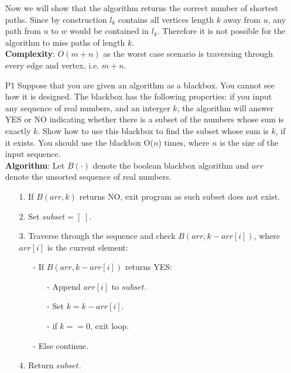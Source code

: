 \documentclass{article}
\begin{document}
\begin{itemize}
          Now we will show that the algorithm returns the correct number of shortest paths. Since by construction $l_k$ contains all vertices length $k$ away from $u$, any path from $u$ to $w$ would be contained in $l_k$. Therefore it is not possible for the algorithm to miss paths of length $k$.\\
          \textbf{Complexity}: $O(m+n)$ as the worst case scenario is traversing through every edge and vertex, i.e. $m+n$.
    \item [P1] Suppose that you are given an algorithm as a blackbox. You cannot see how it is designed. The blackbox has the following properties: if you input any sequence of real numbers, and an interger $k$, the algorithm will answer YES or NO indicating whether there is a subset of the numbers whose sum is exactly $k$. Show how to use this blackbox to find the subset whose sum is $k$, if it exists. You should use the blackbox O($n$) times, where $n$ is the size of the input sequence.\\
          \textbf{Algorithm}: Let $B(\cdot)$ denote the boolean blackbox algorithm and $arr$ denote the unsorted sequence of real numbers.
          \begin{itemize}
              \item [1.] If $B(arr, k)$ returns NO, exit program as such subset does not exist.
              \item [2.] Set $subset=[\;]$.
              \item [3.] Traverse through the sequence and check $B(arr,k-arr[i])$, where $arr[i]$ is the current element:
                    \begin{itemize}
                        \item [-] If $B(arr,k-arr[i])$ returns YES:
                              \begin{itemize}
                                  \item [-] Append $arr[i]$ to $subset$.
                                  \item [-] Set $k=k-arr[i]$.
                                  \item [-] if $k==0$, exit loop.
                              \end{itemize}
                        \item [-] Else continue.
                    \end{itemize}
              \item [4.] Return $subset$.
          \end{itemize}

\end{itemize}
\end{document}
